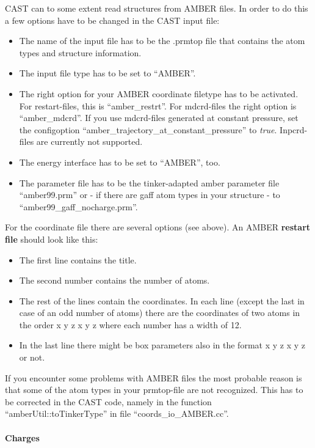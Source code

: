 \documentclass[10pt,a4paper]{article} %
\begin{document}
\ac{CAST} can to some extent read structures from \ac{AMBER} files. In order to do this a few options have to be changed in the CAST input file:
\begin{itemize}
\item The name of the input file has to be the .prmtop file that contains the atom types and structure information.
\item The input file type has to be set to ``AMBER''.
\item The right option for your AMBER coordinate filetype has to be activated. For restart-files, this is ``amber\_restrt''. For mdcrd-files the right option is ``amber\_mdcrd''. If you use mdcrd-files generated at constant pressure, set the configoption ``amber\_trajectory\_at\_constant\_pressure'' to \textit{true}. Inpcrd-files are currently not supported.
\item The energy interface has to be set to ``AMBER'', too.
\item The parameter file has to be the tinker-adapted amber parameter file ``amber99.prm'' or - if there are gaff atom types in your structure - to ``amber99\_gaff\_nocharge.prm''.
\end{itemize}

For the coordinate file there are several options (see above). An AMBER \textbf{restart file }should look like this:
\begin{itemize}
\item The first line contains the title.
\item The second number contains the number of atoms.
\item The rest of the lines contain the coordinates. In each line (except the last in case of an odd number of atoms) there are the coordinates of two atoms in the order x y z x y z where each number has a width of 12.
\item In the last line there might be box parameters also in the format x y z x y z or not.
\end{itemize}

If you encounter some problems with \ac{AMBER} files the most probable reason is that some of the atom types in your prmtop-file are not recognized. This has to be corrected in the \ac{CAST} code, namely in the function ``amberUtil::toTinkerType'' in file ``coords\_io\_AMBER.cc''.

\paragraph{Charges}
\end{document}
